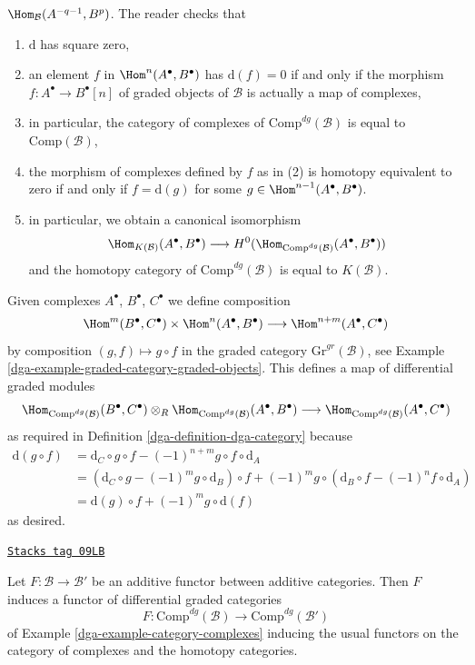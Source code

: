 \begin{example}
$\Hom_\mathcal{B}(A^{-q - 1}, B^p)$. The reader checks that
\begin{enumerate}
\item $\text{d}$ has square zero,
\item an element $f$ in $\Hom^n(A^\bullet, B^\bullet)$
has $\text{d}(f) = 0$ if and only if the morphism
$f : A^\bullet \to B^\bullet[n]$ of graded objects of $\mathcal{B}$
is actually a map of complexes,
\item in particular, the category of complexes of
$\text{Comp}^{dg}(\mathcal{B})$ is equal to $\text{Comp}(\mathcal{B})$,
\item the morphism of complexes defined by $f$ as in (2)
is homotopy equivalent to zero if and only if $f = \text{d}(g)$
for some $g \in \Hom^{n - 1}(A^\bullet, B^\bullet)$.
\item in particular, we obtain a canonical isomorphism
$$
\Hom_{K(\mathcal{B})}(A^\bullet, B^\bullet)
\longrightarrow
H^0(\Hom_{\text{Comp}^{dg}(\mathcal{B})}(A^\bullet, B^\bullet))
$$
and the homotopy category of $\text{Comp}^{dg}(\mathcal{B})$ is equal to
$K(\mathcal{B})$.
\end{enumerate}
Given complexes $A^\bullet$, $B^\bullet$, $C^\bullet$ we define
composition
$$
\Hom^m(B^\bullet, C^\bullet) \times \Hom^n(A^\bullet, B^\bullet)
\longrightarrow
\Hom^{n + m}(A^\bullet, C^\bullet)
$$
by composition $(g, f) \mapsto g \circ f$ in the graded category
$\text{Gr}^{gr}(\mathcal{B})$, see
Example \ref{dga-example-graded-category-graded-objects}.
This defines a map of differential graded modules
$$
\Hom_{\text{Comp}^{dg}(\mathcal{B})}(B^\bullet, C^\bullet)
\otimes_R
\Hom_{\text{Comp}^{dg}(\mathcal{B})}(A^\bullet, B^\bullet)
\longrightarrow
\Hom_{\text{Comp}^{dg}(\mathcal{B})}(A^\bullet, C^\bullet)
$$
as required in Definition \ref{dga-definition-dga-category}
because
\begin{align*}
\text{d}(g \circ f) & =
\text{d}_C \circ g \circ f - (-1)^{n + m} g \circ f \circ \text{d}_A \\
& =
\left(\text{d}_C \circ g - (-1)^m g \circ \text{d}_B\right) \circ f +
(-1)^m g \circ \left(\text{d}_B \circ f - (-1)^n f \circ \text{d}_A\right) \\
& =
\text{d}(g) \circ f + (-1)^m g \circ \text{d}(f)
\end{align*}
as desired.
\end{example}

\begin{lemma}
\label{dga-lemma-additive-functor-induces-dga-functor}
\href{https://stacks.math.columbia.edu/tag/09LB}{\texttt{Stacks tag 09LB}}

Let $F : \mathcal{B} \to \mathcal{B}'$ be an additive functor between
additive categories. Then $F$ induces a functor of differential
graded categories
$$
F : \text{Comp}^{dg}(\mathcal{B}) \to \text{Comp}^{dg}(\mathcal{B}')
$$
of Example \ref{dga-example-category-complexes}
inducing the usual functors on the category of complexes and the
homotopy categories.
\end{lemma}


